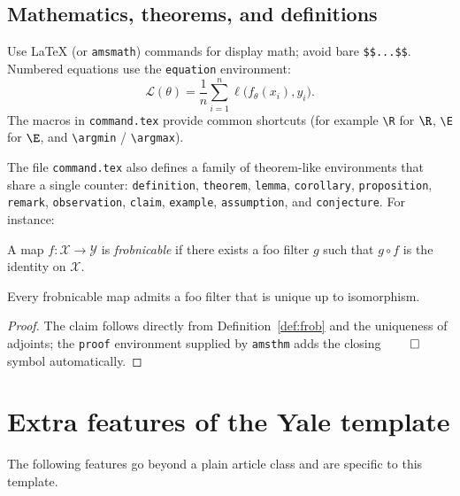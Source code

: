 \documentclass[11pt,letterpaper,logo]{yalearxiv}
\begin{document}
\subsection{Mathematics, theorems, and definitions}
\label{sec:math}

Use \LaTeX{} (or \verb+amsmath+) commands for display math; avoid bare
\verb+$$...$$+. Numbered equations use the \verb+equation+ environment:
\begin{equation}
  \label{eq:sample}
  \mathcal{L}(\theta)
  = \frac{1}{n}\sum_{i=1}^{n} \ell\!\big(f_\theta(x_i), y_i\big).
\end{equation}
The macros in \verb+command.tex+ provide common shortcuts (for example
\verb+\R+ for $\R$, \verb+\E+ for $\E$, and \verb+\argmin+ / \verb+\argmax+).

The file \verb+command.tex+ also defines a family of theorem-like environments
that share a single counter: \verb+definition+, \verb+theorem+, \verb+lemma+,
\verb+corollary+, \verb+proposition+, \verb+remark+, \verb+observation+,
\verb+claim+, \verb+example+, \verb+assumption+, and \verb+conjecture+.
For instance:

\begin{definition}[Frobnication]
\label{def:frob}
A map $f:\mathcal{X}\to\mathcal{Y}$ is \emph{frobnicable} if there exists a foo
filter $g$ such that $g\circ f$ is the identity on $\mathcal{X}$.
\end{definition}

\begin{theorem}
\label{thm:frob}
Every frobnicable map admits a foo filter that is unique up to isomorphism.
\end{theorem}

\begin{proof}
The claim follows directly from Definition~\ref{def:frob} and the uniqueness of
adjoints; the \verb+proof+ environment supplied by \verb+amsthm+ adds the closing
$\qed$ symbol automatically.
\end{proof}


\section{Extra features of the Yale template}
\label{sec:extras}

The following features go beyond a plain article class and are specific to this
template.
\end{document}
